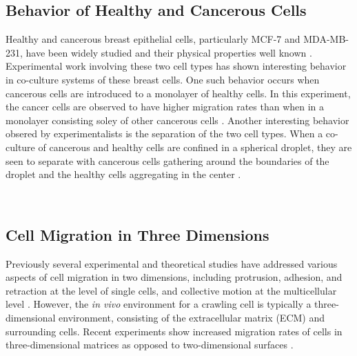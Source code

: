 \documentclass[aps,prb,twocolumn,groupedaddress,nofootinbib,floatfix]{revtex4}
\begin{document}
\subsection{Behavior of Healthy and Cancerous Cells}

Healthy and cancerous breast epithelial cells, particularly MCF-7 and MDA-MB-231, have been widely studied and their physical properties well known \cite{}.
Experimental work involving these two cell types has shown interesting behavior in co-culture systems of these breast cells.
One such behavior occurs when cancerous cells are introduced to a monolayer of healthy cells.
In this experiment, the cancer cells are observed to have higher migration rates than when in a monolayer consisting soley of other cancerous cells \cite{Lee}.
Another interesting behavior obsered by experimentalists is the separation of the two cell types.
When a co-culture of cancerous and healthy cells are confined in a spherical droplet, they are seen to separate with cancerous cells gathering around the boundaries of the droplet and the healthy cells aggregating in the center \cite{Mingming}.

\\

\subsection{Cell Migration in Three Dimensions}

Previously several experimental and theoretical studies have addressed various aspects of cell migration in two dimensions, including protrusion, adhesion, and retraction at the level of single cells, and collective motion at the multicellular level \cite{}.
However, the {\it in vivo} environment for a crawling cell is typically a three-dimensional environment, consisting of the extracellular matrix (ECM) and surrounding cells.
Recent experiments show increased migration rates of cells in three-dimensional matrices as opposed to two-dimensional surfaces \cite{Cukierman}.
\end{document}

